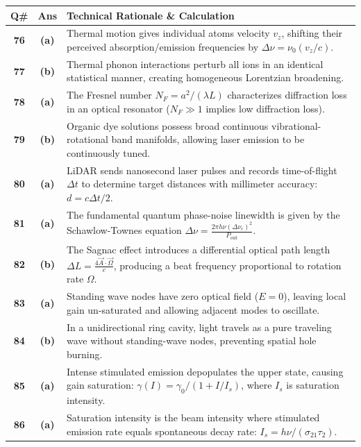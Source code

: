 {\small
\noindent\begin{tabularx}{\textwidth}{|c|c|X|}
\hline
\textbf{Q\#} & \textbf{Ans} & \textbf{Technical Rationale \& Calculation} \\
\hline
\textbf{76} & \textbf{(a)} & Thermal motion gives individual atoms velocity $v_z$, shifting their perceived absorption/emission frequencies by $\Delta\nu = \nu_0(v_z/c)$. \\ \hline
\textbf{77} & \textbf{(b)} & Thermal phonon interactions perturb all ions in an identical statistical manner, creating homogeneous Lorentzian broadening. \\ \hline
\textbf{78} & \textbf{(a)} & The Fresnel number $N_F = a^2/(\lambda L)$ characterizes diffraction loss in an optical resonator ($N_F \gg 1$ implies low diffraction loss). \\ \hline
\textbf{79} & \textbf{(b)} & Organic dye solutions possess broad continuous vibrational-rotational band manifolds, allowing laser emission to be continuously tuned. \\ \hline
\textbf{80} & \textbf{(a)} & LiDAR sends nanosecond laser pulses and records time-of-flight $\Delta t$ to determine target distances with millimeter accuracy: $d = c\Delta t/2$. \\ \hline
\textbf{81} & \textbf{(a)} & The fundamental quantum phase-noise linewidth is given by the Schawlow-Townes equation $\Delta\nu = \frac{2\pi h\nu (\Delta\nu_c)^2}{P_{\text{out}}}$. \\ \hline
\textbf{82} & \textbf{(b)} & The Sagnac effect introduces a differential optical path length $\Delta L = \frac{4\vec{A}\cdot\vec{\Omega}}{c}$, producing a beat frequency proportional to rotation rate $\Omega$. \\ \hline
\textbf{83} & \textbf{(a)} & Standing wave nodes have zero optical field ($E=0$), leaving local gain un-saturated and allowing adjacent modes to oscillate. \\ \hline
\textbf{84} & \textbf{(b)} & In a unidirectional ring cavity, light travels as a pure traveling wave without standing-wave nodes, preventing spatial hole burning. \\ \hline
\textbf{85} & \textbf{(a)} & Intense stimulated emission depopulates the upper state, causing gain saturation: $\gamma(I) = \gamma_0 / (1 + I/I_s)$, where $I_s$ is saturation intensity. \\ \hline
\textbf{86} & \textbf{(a)} & Saturation intensity is the beam intensity where stimulated emission rate equals spontaneous decay rate: $I_s = h\nu/(\sigma_{21}\tau_2)$. \\ \hline

\end{tabularx}}
